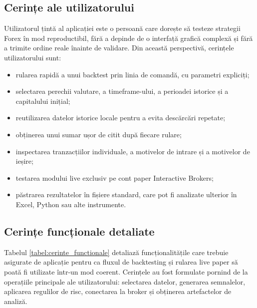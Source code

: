 \subsection{Cerințe ale utilizatorului}
\label{cap:cap3:cerinte_utilizator}

Utilizatorul țintă al aplicației este o persoană care dorește să testeze strategii Forex în mod reproductibil, fără a depinde de o interfață grafică complexă și fără a trimite ordine reale înainte de validare. Din această perspectivă, cerințele utilizatorului sunt:

\begin{itemize}
    \item rularea rapidă a unui backtest prin linia de comandă, cu parametri expliciți;
    \item selectarea perechii valutare, a timeframe-ului, a perioadei istorice și a capitalului inițial;
    \item reutilizarea datelor istorice locale pentru a evita descărcări repetate;
    \item obținerea unui sumar ușor de citit după fiecare rulare;
    \item inspectarea tranzacțiilor individuale, a motivelor de intrare și a motivelor de ieșire;
    \item testarea modului live exclusiv pe cont paper Interactive Brokers;
    \item păstrarea rezultatelor în fișiere standard, care pot fi analizate ulterior în Excel, Python sau alte instrumente.
\end{itemize}

\subsection{Cerințe funcționale detaliate}
\label{cap:cap3:cerinte_functionale}

Tabelul \ref{tabel:cerinte_functionale} detaliază funcționalitățile care trebuie asigurate de aplicație pentru ca fluxul de backtesting și rularea live paper să poată fi utilizate într-un mod coerent. Cerințele au fost formulate pornind de la operațiile principale ale utilizatorului: selectarea datelor, generarea semnalelor, aplicarea regulilor de risc, conectarea la broker și obținerea artefactelor de analiză.

